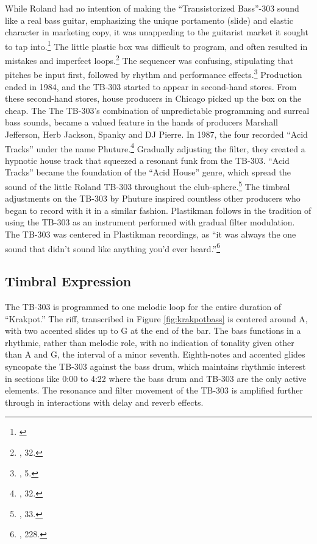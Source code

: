 \documentclass[12pt,twoside]{reedthesis}
\begin{document}
While Roland had no intention of making the ``Transistorized Bass''-303 sound like a real bass guitar, emphasizing the unique portamento (slide) and elastic character in marketing copy, it was unappealing to the guitarist market it sought to tap into.\footnote{\cite{ravalRolandTB303Not2020}} The little plastic box was difficult to program, and often resulted in mistakes and imperfect loops.\footnote{\cite{reynoldsGenerationEcstasyWorld1998}, 32.} The sequencer was confusing, stipulating that pitches be input first, followed by rhythm and performance effects.\footnote{\cite{RolandTB303Owner1981}, 5.} Production ended in 1984, and the TB-303 started to appear in second-hand stores. From these second-hand stores, house producers in Chicago picked up the box on the cheap. The The TB-303's combination of unpredictable programming and surreal bass sounds, became a valued feature in the hands of producers Marshall Jefferson, Herb Jackson, Spanky and DJ Pierre. In 1987, the four recorded ``Acid Tracks'' under the name Phuture.\footnote{\cite{reynoldsGenerationEcstasyWorld1998}, {32}.} Gradually adjusting the filter, they created a hypnotic house track that squeezed a resonant funk from the TB-303. ``Acid Tracks'' became the foundation of the ``Acid House'' genre, which spread the sound of the little Roland TB-303 throughout the club-sphere.\footnote{\cite{reynoldsGenerationEcstasyWorld1998}, {33}.} The timbral adjustments on the TB-303 by Phuture inspired countless other producers who began to record with it in a similar fashion. Plastikman follows in the tradition of using the TB-303 as an instrument performed with gradual filter modulation. The TB-303 was centered in Plastikman recordings, as ``it was always the one sound that didn’t sound like anything you’d ever heard.''\footnote{\cite{reynoldsGenerationEcstasyWorld1998}, 228.}


\subsection{Timbral Expression}

The TB-303 is programmed to one melodic loop for the entire duration of ``Krakpot.'' The riff, transcribed in Figure \ref{fig:krakpotbass} is centered around A, with two accented slides up to G at the end of the bar. The bass functions in a rhythmic, rather than melodic role, with no indication of tonality given other than A and G, the interval of a minor seventh. Eighth-notes and accented glides syncopate the TB-303 against the bass drum, which maintains rhythmic interest in sections like 0:00 to 4:22 where the bass drum and TB-303 are the only active elements. The resonance and filter movement of the TB-303 is amplified further through in interactions with delay and reverb effects.
\end{document}

